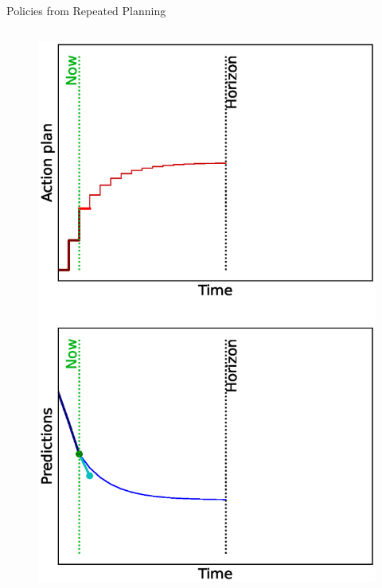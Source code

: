 \documentclass[lecture]{beamer}
\begin{document}
\begin{frame}{\normalsize Policies from Repeated Planning}
\begin{columns}
\begin{overlayarea}{\textwidth}{0.9\textheight}
\begin{figure}
{         \includegraphics[width=\FS\textwidth,clip]{Codes/MPC/MPC2.eps}
        }%
        {%
}
\end{figure}
\end{overlayarea}
\end{columns}
\end{frame}
\end{document}
